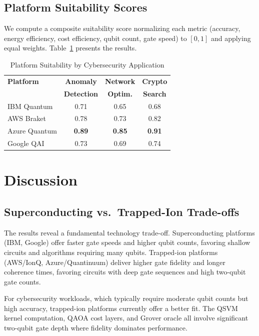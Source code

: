 \documentclass[conference]{IEEEtran}
\begin{document}
\subsection{Platform Suitability Scores}

We compute a composite suitability score normalizing each metric (accuracy, energy efficiency, cost efficiency, qubit count, gate speed) to $[0, 1]$ and applying equal weights. Table~\ref{tab:suitability} presents the results.

\begin{table}[htbp]
\caption{Platform Suitability by Cybersecurity Application}
\label{tab:suitability}
\centering
\begin{tabular}{lccc}
\toprule
\textbf{Platform} & \textbf{Anomaly} & \textbf{Network} & \textbf{Crypto} \\
 & \textbf{Detection} & \textbf{Optim.} & \textbf{Search} \\
\midrule
IBM Quantum & 0.71 & 0.65 & 0.68 \\
AWS Braket & 0.78 & 0.73 & 0.82 \\
Azure Quantum & \textbf{0.89} & \textbf{0.85} & \textbf{0.91} \\
Google QAI & 0.73 & 0.69 & 0.74 \\
\bottomrule
\end{tabular}
\end{table}

\section{Discussion}

\subsection{Superconducting vs.\ Trapped-Ion Trade-offs}

The results reveal a fundamental technology trade-off. Superconducting platforms (IBM, Google) offer faster gate speeds and higher qubit counts, favoring shallow circuits and algorithms requiring many qubits. Trapped-ion platforms (AWS/IonQ, Azure/Quantinuum) deliver higher gate fidelity and longer coherence times, favoring circuits with deep gate sequences and high two-qubit gate counts.

For cybersecurity workloads, which typically require moderate qubit counts but high accuracy, trapped-ion platforms currently offer a better fit. The QSVM kernel computation, QAOA cost layers, and Grover oracle all involve significant two-qubit gate depth where fidelity dominates performance.
\end{document}
